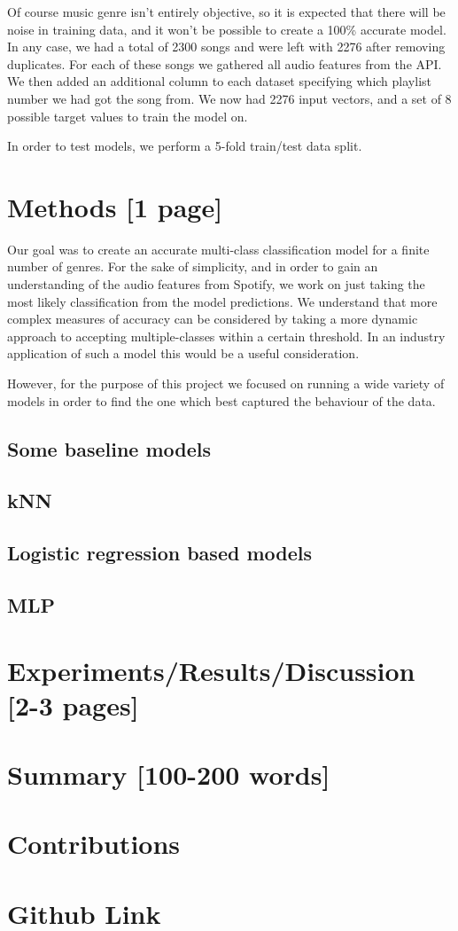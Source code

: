 \documentclass[12pt, a4]{article} %
\begin{document}
Of course music genre isn't entirely objective, so it is expected that there will be noise in training data, and it won't be possible to create a 100\% accurate model. In any case, we had a total of 2300 songs and were left with 2276 after removing duplicates. For each of these songs we gathered all audio features from the API. We then added an additional column to each dataset specifying which playlist number we had got the song from. We now had 2276 input vectors, and a set of 8 possible target values to train the model on.\newline

In order to test models, we perform a 5-fold train/test data split.\newline


\section{Methods [1 page]}
Our goal was to create an accurate multi-class classification model for a finite number of genres. For the sake of simplicity, and in order to gain an understanding of the audio features from Spotify, we work on just taking the most likely classification from the model predictions. We understand that more complex measures of accuracy can be considered by taking a more dynamic approach to accepting multiple-classes within a certain threshold. In an industry application of such a model this would be a useful consideration.\newline 

However, for the purpose of this project we focused on running a wide variety of models in order to find the one which best captured the behaviour of the data.





\subsection{Some baseline models}
\subsection{kNN}
\subsection{Logistic regression based models}
\subsection{MLP}
\section{Experiments/Results/Discussion [2-3 pages]}
\section{Summary [100-200 words]}
\section{Contributions}
\section{Github Link}
\end{document}
